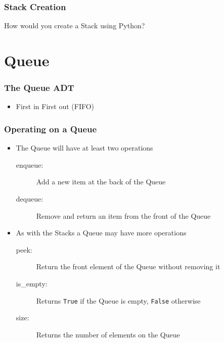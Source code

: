 \documentclass[11pt]{beamer}
\begin{document}
\begin{frame}\frametitle{Stack Creation}
\begin{block}{}
\centering\Huge How would you create a Stack using Python?
\end{block}
\end{frame}


\section{Queue}

\begin{frame}\frametitle{The Queue ADT}
\begin{itemize}
\item First in First out (FIFO)
\end{itemize}
\vspace{0.4cm}
\begin{center}
\end{center}
\end{frame}

\begin{frame}\frametitle{Operating on a Queue}
\begin{itemize}
\item The Queue will have at least two operations
    \begin{description}
    \item[enqueue:] Add a new item at the back of the Queue
    \item[dequeue:] Remove and return an item from the front of the Queue
    \end{description}
\item As with the Stacks a Queue may have more operations
    \begin{description}
    \item[peek:] Return the front element of the Queue without removing it
    \item[is\_empty:] Returns \lstinline|True| if the Queue is empty, \lstinline|False| otherwise
    \item[size:] Returns the number of elements on the Queue
    \end{description}
\end{itemize}
\end{frame}
\end{document}
